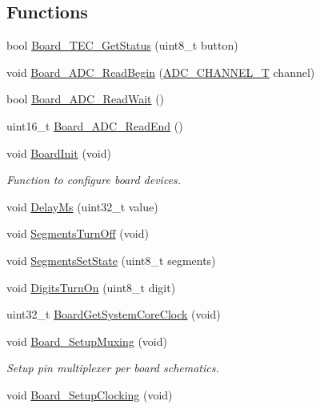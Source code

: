\subsection*{Functions}
\begin{DoxyCompactItemize}
\item 
bool \hyperlink{group__hal_ga872de86244ed2e3b86c2bf26b9c64733}{Board\+\_\+\+T\+E\+C\+\_\+\+Get\+Status} (uint8\+\_\+t button)
\item 
void \hyperlink{group__hal_ga8cc33a8b61c622ac85ae3740a121100b}{Board\+\_\+\+A\+D\+C\+\_\+\+Read\+Begin} (\hyperlink{group___a_d_c__18_x_x__43_x_x_ga30ee7058bc7cc1daff718b29b42bed4e}{A\+D\+C\+\_\+\+C\+H\+A\+N\+N\+E\+L\+\_\+T} channel)
\item 
bool \hyperlink{group__hal_ga0e575f815466079643b007d0279f28bf}{Board\+\_\+\+A\+D\+C\+\_\+\+Read\+Wait} ()
\item 
uint16\+\_\+t \hyperlink{group__hal_ga51147ea5d2ae45e50453fbdd4e2c590d}{Board\+\_\+\+A\+D\+C\+\_\+\+Read\+End} ()
\item 
void \hyperlink{group__hal_gad24575a3bcf2c2433e7720830d813e64}{Board\+Init} (void)
\begin{DoxyCompactList}\small\item\em Function to configure board devices. \end{DoxyCompactList}\item 
void \hyperlink{group__hal_gace922d758774792e0573b7c568fe2a3f}{Delay\+Ms} (uint32\+\_\+t value)
\item 
void \hyperlink{group__hal_ga76d9235760f7648a267f3b754ec0abf7}{Segments\+Turn\+Off} (void)
\item 
void \hyperlink{group__hal_gae15c80f1fc4f726afc46735ce5a60877}{Segments\+Set\+State} (uint8\+\_\+t segments)
\item 
void \hyperlink{group__hal_gab32fd447ccc48c0f3b71bcf5f7700d25}{Digits\+Turn\+On} (uint8\+\_\+t digit)
\item 
uint32\+\_\+t \hyperlink{group__hal_ga736805438a3d3b44d06eb01ab1932324}{Board\+Get\+System\+Core\+Clock} (void)
\item 
void \hyperlink{group__hal_ga8ac1dc465c66e1cc00f5ffd346904d97}{Board\+\_\+\+Setup\+Muxing} (void)
\begin{DoxyCompactList}\small\item\em Setup pin multiplexer per board schematics. \end{DoxyCompactList}\item 
void \hyperlink{group__hal_gae417dc93d00f1a89f74220e569fac777}{Board\+\_\+\+Setup\+Clocking} (void)

\end{DoxyCompactItemize}
